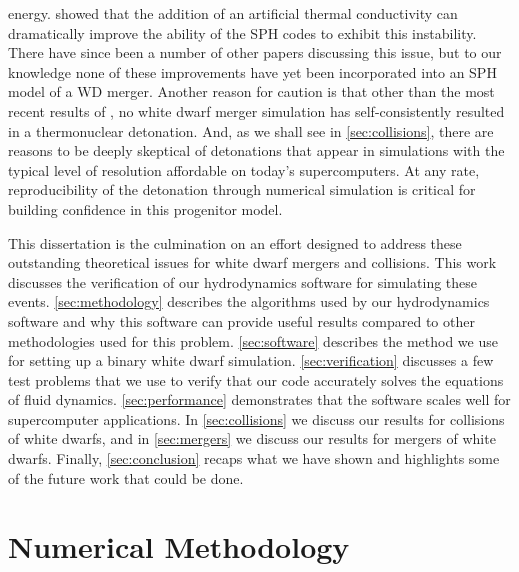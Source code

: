 \documentclass[12pt]{article}
\begin{document}
energy. \citeauthor{price:2008} showed that the addition of an
artificial thermal conductivity can dramatically improve the ability
of the SPH codes to exhibit this instability. There have since been a
number of other papers discussing this issue, but to our knowledge
none of these improvements have yet been incorporated into an SPH
model of a WD merger. Another reason for caution is that other than the
most recent results of \cite{kashyap:2015}, no white dwarf merger
simulation has self-consistently resulted in a thermonuclear detonation.
And, as we shall see in \autoref{sec:collisions}, there are reasons to be
deeply skeptical of detonations that appear in simulations with the typical
level of resolution affordable on today's supercomputers. At any rate,
reproducibility of the detonation through numerical simulation is critical
for building confidence in this progenitor model.

This dissertation is the culmination on an effort designed to address these
outstanding theoretical issues for white dwarf mergers and collisions. This work 
discusses the verification of our hydrodynamics software for simulating
these events. \autoref{sec:methodology} describes the algorithms used by our
hydrodynamics software and why this software can provide useful results compared to
other methodologies used for this problem. \autoref{sec:software} describes
the method we use for setting up a binary white dwarf simulation.
\autoref{sec:verification} discusses a few test problems that we use
to verify that our code accurately solves the equations of fluid dynamics.
\autoref{sec:performance} demonstrates that the software scales well for
supercomputer applications. In \autoref{sec:collisions} we discuss our
results for collisions of white dwarfs, and in \autoref{sec:mergers} we
discuss our results for mergers of white dwarfs. Finally, \autoref{sec:conclusion}
recaps what we have shown and highlights some of the future work that
could be done.



\newpage
\section{Numerical Methodology}
\label{sec:methodology}
\end{document}
